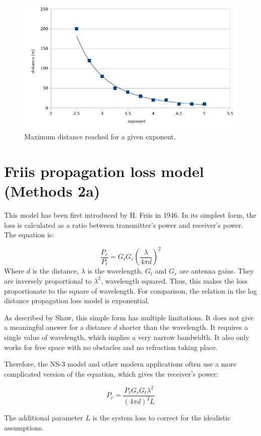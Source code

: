 \documentclass[11pt,journal]{article}
\begin{document}
	
	\begin{figure}[h]
		\centering
		\includegraphics[scale=0.6]{graph_log_exponent.png}
		\caption{Maximum distance reached for a given exponent.}
	\end{figure}
	\pagebreak
	\section{Friis propagation loss model\cite{friis doc} (Methods 2a)}
	This model has been first introduced by H. Friis in 1946\cite{Friis note}. In its simplest form, the loss is calculated as a ratio between transmitter's power and receiver's power. The equation is:
	
	\[\frac{P_r}{P_t} = G_tG_r(\frac{\lambda}{4\pi d})^2  \]
	Where $d$ is the distance, $\lambda$ is the wavelength, $G_t$ and $G_r$ are antenna gains. They are inversely proportional to $\lambda ^2$, wavelength squared. Thus, this makes the loss proportionate to the square of wavelength. For comparison, the relation in the log distance propagation loss model is exponential.
		
	As described by Shaw\cite{Shaw}, this simple form has multiple limitations. It does not give a meaningful answer for a distance $d$ shorter than the wavelength. It requires a single value of wavelength, which implies a very narrow bandwidth. It also only works for free space with no obstacles and no refraction taking place.
	
	Therefore, the NS-3 model and other modern applications often use a more complicated version of the equation, which gives the receiver's power:
	
	\[P_r = \dfrac{P_tG_rG_t\lambda ^2}{(4\pi d)^2 L}\]
	
	The additional parameter $L$ is the system loss to correct for the idealistic assumptions.
	
\end{document}
